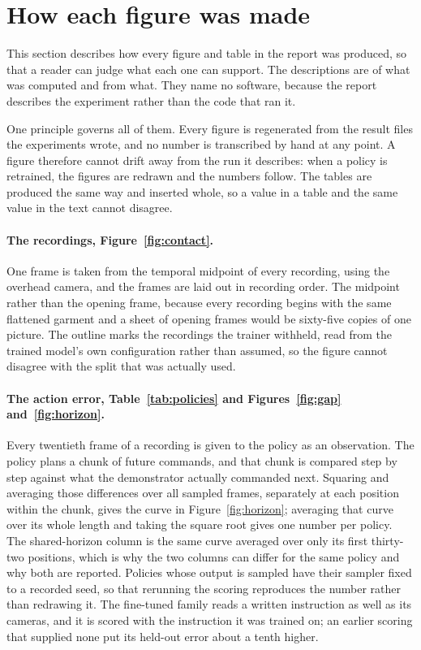 \section{How each figure was made}
\label{sec:provenance}

This section describes how every figure and table in the report was produced,
so that a reader can judge what each one can support. The descriptions are of
what was computed and from what. They name no software, because the report
describes the experiment rather than the code that ran it.

One principle governs all of them. Every figure is regenerated from the result
files the experiments wrote, and no number is transcribed by hand at any point.
A figure therefore cannot drift away from the run it describes: when a policy is
retrained, the figures are redrawn and the numbers follow. The tables are
produced the same way and inserted whole, so a value in a table and the same
value in the text cannot disagree.

\paragraph{The recordings, Figure~\ref{fig:contact}.}
One frame is taken from the temporal midpoint of every recording, using the
overhead camera, and the frames are laid out in recording order. The midpoint
rather than the opening frame, because every recording begins with the same
flattened garment and a sheet of opening frames would be sixty-five copies of
one picture. The outline marks the recordings the trainer withheld, read from
the trained model's own configuration rather than assumed, so the figure cannot
disagree with the split that was actually used.

\paragraph{The action error, Table~\ref{tab:policies} and
Figures~\ref{fig:gap} and~\ref{fig:horizon}.}
Every twentieth frame of a recording is given to the policy as an observation.
The policy plans a chunk of future commands, and that chunk is compared step by
step against what the demonstrator actually commanded next. Squaring and
averaging those differences over all sampled frames, separately at each position
within the chunk, gives the curve in Figure~\ref{fig:horizon}; averaging that
curve over its whole length and taking the square root gives one number per
policy. The shared-horizon column is the same curve averaged over only its first
thirty-two positions, which is why the two columns can differ for the same
policy and why both are reported. Policies whose output is sampled have their
sampler fixed to a recorded seed, so that rerunning the scoring reproduces the
number rather than redrawing it. The fine-tuned family reads a written
instruction as well as its cameras, and it is scored with the instruction it
was trained on; an earlier scoring that supplied none put its held-out error
about a tenth higher.

